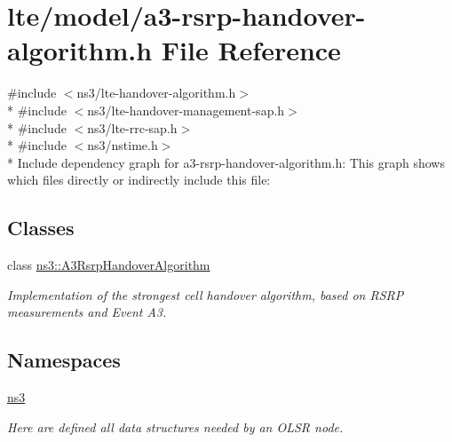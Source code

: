 \hypertarget{a3-rsrp-handover-algorithm_8h}{}\section{lte/model/a3-\/rsrp-\/handover-\/algorithm.h File Reference}
\label{a3-rsrp-handover-algorithm_8h}
{\ttfamily \#include $<$ns3/lte-\/handover-\/algorithm.\+h$>$}\\*
{\ttfamily \#include $<$ns3/lte-\/handover-\/management-\/sap.\+h$>$}\\*
{\ttfamily \#include $<$ns3/lte-\/rrc-\/sap.\+h$>$}\\*
{\ttfamily \#include $<$ns3/nstime.\+h$>$}\\*
Include dependency graph for a3-\/rsrp-\/handover-\/algorithm.h\+:
This graph shows which files directly or indirectly include this file\+:
\subsection*{Classes}
\begin{DoxyCompactItemize}
\item 
class \hyperlink{classns3_1_1A3RsrpHandoverAlgorithm}{ns3\+::\+A3\+Rsrp\+Handover\+Algorithm}
\begin{DoxyCompactList}\small\item\em Implementation of the strongest cell handover algorithm, based on R\+S\+RP measurements and Event A3. \end{DoxyCompactList}\end{DoxyCompactItemize}
\subsection*{Namespaces}
\begin{DoxyCompactItemize}
\item 
 \hyperlink{namespacens3}{ns3}
\begin{DoxyCompactList}\small\item\em Here are defined all data structures needed by an O\+L\+SR node. \end{DoxyCompactList}\end{DoxyCompactItemize}
